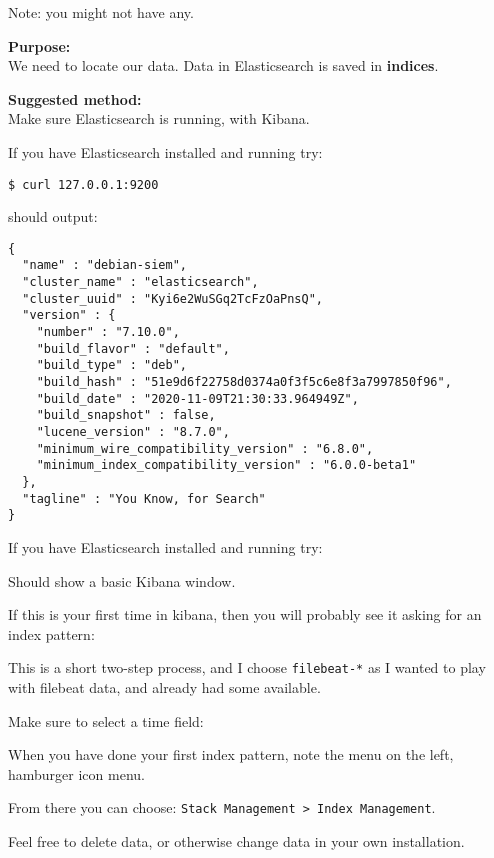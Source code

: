 \documentclass[a4paper,11pt,notitlepage]{report}
\begin{document}
Note: you might not have any.

{\bf Purpose:}\\
We need to locate our data. Data in Elasticsearch is saved in {\bf indices}.


{\bf Suggested method:}\\
Make sure Elasticsearch is running, with Kibana.

If you have Elasticsearch installed and running try: 

\begin{verbatim}
$ curl 127.0.0.1:9200
\end{verbatim}
should output:
\begin{verbatim}
{
  "name" : "debian-siem",
  "cluster_name" : "elasticsearch",
  "cluster_uuid" : "Kyi6e2WuSGq2TcFzOaPnsQ",
  "version" : {
    "number" : "7.10.0",
    "build_flavor" : "default",
    "build_type" : "deb",
    "build_hash" : "51e9d6f22758d0374a0f3f5c6e8f3a7997850f96",
    "build_date" : "2020-11-09T21:30:33.964949Z",
    "build_snapshot" : false,
    "lucene_version" : "8.7.0",
    "minimum_wire_compatibility_version" : "6.8.0",
    "minimum_index_compatibility_version" : "6.0.0-beta1"
  },
  "tagline" : "You Know, for Search"
}
\end{verbatim}


If you have Elasticsearch installed and running try: 

Should show a basic Kibana window.


If this is your first time in kibana, then you will probably see it asking for an index pattern:

This is a short two-step process, and I choose \verb+filebeat-*+ as I wanted to play with filebeat data, and already had some available.


Make sure to select a time field:


When you have done your first index pattern, note the menu on the left, hamburger icon menu.

From there you can choose: \verb+Stack Management > Index Management+.


Feel free to delete data, or otherwise change data in your own installation.
\end{document}
